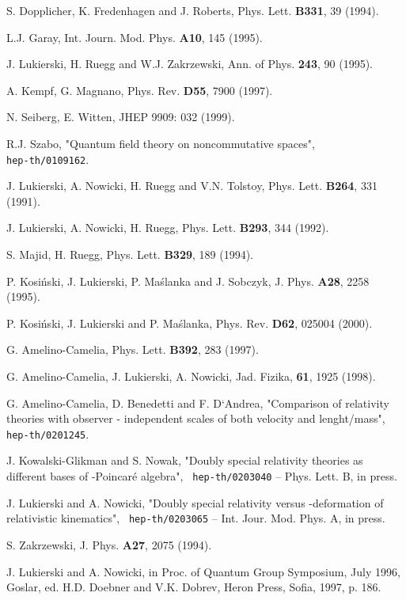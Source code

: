 \documentclass[a4paper,12pt]{article}
\begin{document}
\begin{thebibliography}{99}
S. Dopplicher, K. Fredenhagen and J. Roberts, Phys. Lett. {\bf
B331},  39 (1994).

L.J. Garay, Int. Journ. Mod. Phys. {\bf A10}, 145 (1995).

J. Lukierski, H. Ruegg and W.J. Zakrzewski, Ann. of Phys. {\bf
243}, 90 (1995).

A. Kempf, G. Magnano, Phys. Rev. {\bf D55}, 7900 (1997).

N. Seiberg, E. Witten, JHEP 9909: 032 (1999).

R.J. Szabo, "Quantum field theory on noncommutative spaces",
 \\{\tt hep-th/0109162}.

J. Lukierski, A. Nowicki,  H. Ruegg and V.N. Tolstoy,
  Phys. Lett. {\bf B264}, 331 (1991).

J. Lukierski, A. Nowicki,  H. Ruegg, Phys. Lett. {\bf B293}, 
         344 (1992).

S. Majid, H. Ruegg, Phys. Lett. {\bf B329}, 189 (1994).

P. Kosi\'{n}ski, J. Lukierski, P. Ma\'{s}lanka and J. Sobczyk, 
   J. Phys. {\bf A28}, 2258 (1995).

P. Kosi\'{n}ski, J. Lukierski and P. Ma\'{s}lanka, Phys. Rev. 
 {\bf D62}, 025004 (2000).

G. Amelino-Camelia, Phys. Lett. {\bf B392}, 283
(1997).

G. Amelino-Camelia, J. Lukierski, A. Nowicki, Jad. Fizika, 
{\bf 61}, 1925 (1998).

G. Amelino-Camelia, D. Benedetti and F. D`Andrea, 
"Comparison of relativity theories with observer - independent scales 
of both velocity and
lenght/mass", {\tt hep-th/0201245}.

J. Kowalski-Glikman and S. Nowak, "Doubly special 
relativity theories as
different bases of \myHighlight{$\kappa$}\coordHE{}-Poincar\'{e} algebra", {\tt
hep-th/0203040} -- Phys. Lett. B, in press.


J. Lukierski and A. Nowicki, "Doubly special relativity versus
\myHighlight{$\kappa$}\coordHE{}-deformation of relativistic kinematics", {\tt
hep-th/0203065} -- Int. Jour. Mod. Phys. A, in press.

S. Zakrzewski, J. Phys. {\bf A27}, 2075 (1994).

J. Lukierski and A. Nowicki,  in Proc. of Quantum Group
Symposium, July 1996, Goslar, ed. H.D. Doebner and V.K. Dobrev,
Heron Press, Sofia, 1997, p. 186.


\end{thebibliography}
\end{document}
